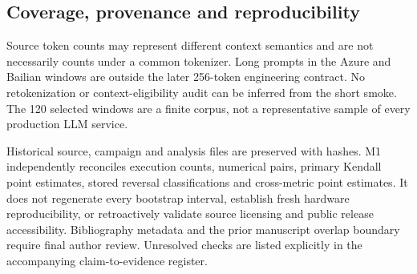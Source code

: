 \subsection{Coverage, provenance and reproducibility}
Source token counts may represent different context semantics and are not
necessarily counts under a common tokenizer. Long prompts in the Azure and
Bailian windows are outside the later 256-token engineering contract. No
retokenization or context-eligibility audit can be inferred from the short
smoke. The 120 selected windows are a finite corpus, not a representative
sample of every production LLM service.

Historical source, campaign and analysis files are preserved with hashes.
M1 independently reconciles execution counts, numerical pairs, primary
Kendall point estimates, stored reversal classifications and cross-metric
point estimates. It does not regenerate every bootstrap interval, establish
fresh hardware reproducibility, or retroactively validate source licensing
and public release accessibility. Bibliography metadata and the prior
manuscript overlap boundary require final author review. Unresolved
checks are listed explicitly in the accompanying claim-to-evidence register.
